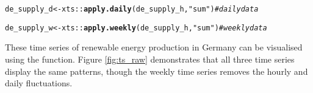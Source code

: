 \documentclass[article,shortnames,nojss]{jss}\usepackage[]{graphicx}\usepackage[]{xcolor}
\makeatletter
\newcommand{\hlstr}[1]{\textcolor[rgb]{0.192,0.494,0.8}{#1}}%
\newcommand{\hlcom}[1]{\textcolor[rgb]{0.678,0.584,0.686}{\textit{#1}}}%
\newcommand{\hlopt}[1]{\textcolor[rgb]{0,0,0}{#1}}%
\newcommand{\hlstd}[1]{\textcolor[rgb]{0.345,0.345,0.345}{#1}}%
\newcommand{\hlkwb}[1]{\textcolor[rgb]{0.69,0.353,0.396}{#1}}%
\newcommand{\hlkwd}[1]{\textcolor[rgb]{0.737,0.353,0.396}{\textbf{#1}}}%
\newenvironment{kframe}{%
 \def\at@end@of@kframe{}%
 \ifinner\ifhmode%
  \def\at@end@of@kframe{\end{minipage}}%
  \begin{minipage}{\columnwidth}%
 \fi\fi%
 \def\FrameCommand##1{\hskip\@totalleftmargin \hskip-\fboxsep
 \colorbox{shadecolor}{##1}\hskip-\fboxsep
     \hskip-\linewidth \hskip-\@totalleftmargin \hskip\columnwidth}%
 \MakeFramed {\advance\hsize-\width
   \@totalleftmargin\z@ \linewidth\hsize
   \@setminipage}}%
 {\par\unskip\endMakeFramed%
 \at@end@of@kframe}
\newenvironment{knitrout}{}{} %
\makeatother
\begin{document}
\begin{knitrout}
\color{fgcolor}\begin{kframe}
\begin{alltt}
\hlstd{de_supply_d} \hlkwb{<-} \hlstd{xts}\hlopt{::}\hlkwd{apply.daily}\hlstd{(de_supply_h,} \hlstr{"sum"}\hlstd{)}    \hlcom{# daily data}
\end{alltt}


{\ttfamily\noindent\bfseries\color{errorcolor}{\#\# Error in eval(expr, envir, enclos): object 'de\_supply\_h' not found}}\begin{alltt}
\hlstd{de_supply_w} \hlkwb{<-} \hlstd{xts}\hlopt{::}\hlkwd{apply.weekly}\hlstd{(de_supply_h,} \hlstr{"sum"}\hlstd{)}   \hlcom{# weekly data}
\end{alltt}


{\ttfamily\noindent\bfseries\color{errorcolor}{\#\# Error in eval(expr, envir, enclos): object 'de\_supply\_h' not found}}\end{kframe}
\end{knitrout}

These time series of renewable energy production in Germany can be visualised using the  function. Figure \ref{fig:ts_raw} demonstrates that all three time series display the same patterns, though the weekly time series removes the hourly and daily fluctuations.
\end{document}
